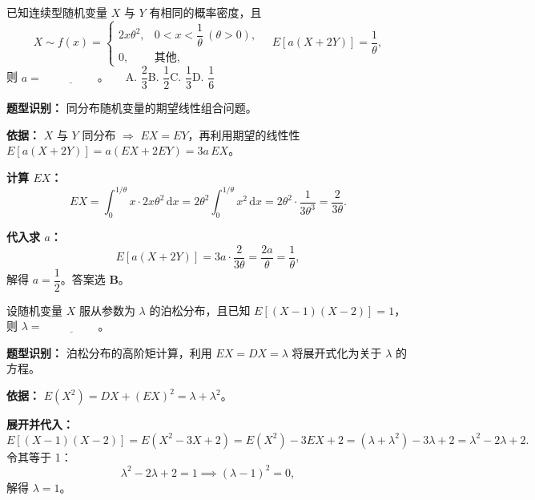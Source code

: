 ﻿\documentclass[lang=cn,11pt]{elegantbook}
\begin{document}
\begin{exercise}\label{exer:4-s1-linear}
已知连续型随机变量 \(X\) 与 \(Y\) 有相同的概率密度，且
\[
X \sim f(x) = \begin{cases} 2x\theta^2, & 0 < x < \dfrac{1}{\theta}\ (\theta > 0), \\[4pt] 0, & \text{其他}, \end{cases}
\quad E[a(X+2Y)] = \frac{1}{\theta},
\]
则 \(a =\,\underline{\hspace{2cm}}\)。~~~A. \(\dfrac{2}{3}\)\quad B. \(\dfrac{1}{2}\)\quad C. \(\dfrac{1}{3}\)\quad D. \(\dfrac{1}{6}\)
\end{exercise}
\begin{solution}
\textbf{题型识别：} 同分布随机变量的期望线性组合问题。

\textbf{依据：} $X$ 与 $Y$ 同分布 $\Rightarrow$ $EX = EY$，再利用期望的线性性 $E[a(X+2Y)] = a(EX + 2EY) = 3a\,EX$。

\textbf{计算 $EX$：}
\[
EX = \int_0^{1/\theta} x \cdot 2x\theta^2\,\mathrm{d}x = 2\theta^2\int_0^{1/\theta} x^2\,\mathrm{d}x = 2\theta^2\cdot\frac{1}{3\theta^3} = \frac{2}{3\theta}.
\]

\textbf{代入求 $a$：}
\[
E[a(X+2Y)] = 3a\cdot\frac{2}{3\theta} = \frac{2a}{\theta} = \frac{1}{\theta},
\]
解得 $a = \dfrac{1}{2}$。答案选 \textbf{B}。
\end{solution}


\begin{exercise}\label{exer:4-s8-poisson}
设随机变量 \(X\) 服从参数为 \(\lambda\) 的泊松分布，且已知 \(E[(X-1)(X-2)] = 1\)，则 \(\lambda =\,\underline{\hspace{2cm}}\)。
\end{exercise}
\begin{solution}
\textbf{题型识别：} 泊松分布的高阶矩计算，利用 $EX = DX = \lambda$ 将展开式化为关于 $\lambda$ 的方程。

\textbf{依据：} $E(X^2) = DX + (EX)^2 = \lambda + \lambda^2$。

\textbf{展开并代入：}
\[
E[(X-1)(X-2)] = E(X^2 - 3X + 2) = E(X^2) - 3EX + 2 = (\lambda + \lambda^2) - 3\lambda + 2 = \lambda^2 - 2\lambda + 2.
\]
令其等于 1：
\[
\lambda^2 - 2\lambda + 2 = 1 \implies (\lambda - 1)^2 = 0,
\]
解得 $\lambda = 1$。
\end{solution}
\end{document}
